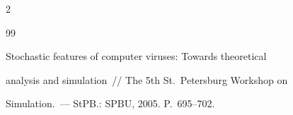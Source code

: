 \begin{multicols}{2}
{{\begin{thebibliography}{99}




 Stochastic features of computer viruses: Towards theoretical


analysis and simulation~// The 5th  St.\ Petersburg Workshop on


Simulation.~--- StPB.: SPBU, 2005. P.~695--702.





\end{thebibliography}


\label{end\stat}


} 


}


\end{multicols}


